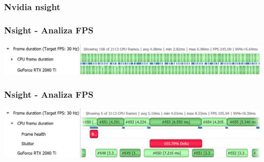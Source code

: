 \documentclass{beamer}
\begin{document}
          \frametitle{Nvidia nsight}
          {
            \begin{frame}
            \end{frame}
            }
          

          \begin{frame}
          \frametitle{Nsight - Analiza FPS}
          \center
          \includegraphics[width=1\textwidth]{fps_overview.png}
          \end{frame}

          \begin{frame}
            \frametitle{Nsight - Analiza FPS}
            \center
            \includegraphics[width=1\textwidth]{stutter_row.png}
            \end{frame}
\end{document}
